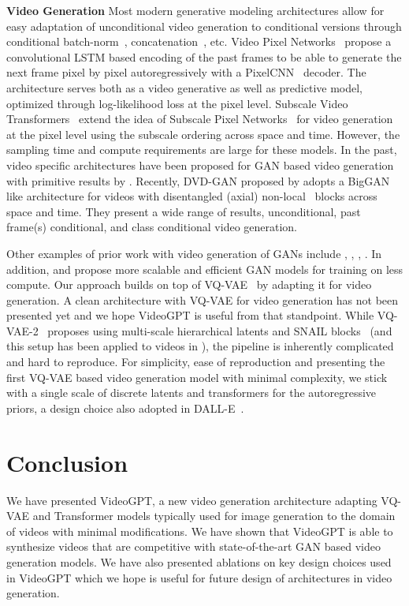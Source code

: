 \documentclass{article}
\begin{document}
{\bf Video Generation}
Most modern generative modeling architectures allow for easy adaptation of unconditional video generation to conditional versions through conditional batch-norm~\citep{brock2018large}, concatenation~\citep{salimans2017pixelcnn++, oord2016conditional}, etc. Video Pixel Networks~\citep{kalchbrenner2017video} propose a convolutional LSTM based encoding of the past frames to be able to generate the next frame pixel by pixel autoregressively with a PixelCNN~\citep{oord2016conditional} decoder. The architecture serves both as a video generative as well as predictive model, optimized through log-likelihood loss at the pixel level. Subscale Video Transformers~\citep{weissenborn2019scaling} extend the idea of Subscale Pixel Networks~\citep{menick2018generating} for video generation at the pixel level using the subscale ordering across space and time. However, the sampling time and compute requirements are large for these models. In the past, video specific architectures have been proposed for GAN based video generation with primitive results by \cite{vondrick2016generating}. Recently, DVD-GAN proposed by \cite{clark2019adversarial} adopts a BigGAN like architecture for videos with disentangled (axial) non-local~\citep{wang2017non} blocks across space and time. They present a wide range of results, unconditional, past frame(s) conditional, and class conditional video generation. 

Other examples of prior work with video generation of GANs include \cite{saito2017temporal}, \cite{tulyakov2018mocogan}, \cite{acharya2018towards}, \cite{yushchenko2019markov}. In addition, \cite{saito2018tganv2} and \cite{kahembwe2020lower} propose more scalable and efficient GAN models for training on less compute. Our approach builds on top of VQ-VAE~\citep{van2017neural} by adapting it for video generation. A clean architecture with VQ-VAE for video generation has not been presented yet and we hope VideoGPT is useful from that standpoint. While VQ-VAE-2~\citep{razavi2019generating} proposes using multi-scale hierarchical latents and SNAIL blocks~\cite{chen2017pixelsnail} (and this setup has been applied to videos in \cite{walker2021predicting}), the pipeline is inherently complicated and hard to reproduce. For simplicity, ease of reproduction and presenting the first VQ-VAE based video generation model with minimal complexity, we stick with a single scale of discrete latents and transformers for the autoregressive priors, a design choice also adopted in DALL-E~\cite{ramesh2021zero}. 
\section{Conclusion}
We have presented VideoGPT, a new video generation architecture adapting VQ-VAE and Transformer models typically used for image generation to the domain of videos with minimal modifications. We have shown that VideoGPT is able to synthesize videos that are competitive with state-of-the-art GAN based video generation models. We have also presented ablations on key design choices used in VideoGPT which we hope is useful for future design of architectures in video generation. 
\end{document}
